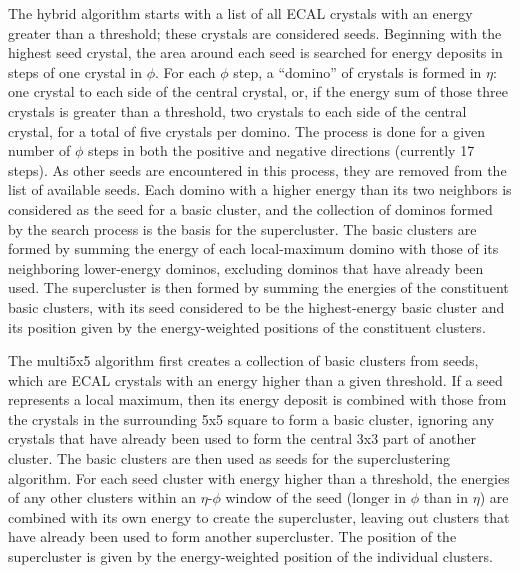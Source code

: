 The hybrid algorithm starts with a list of all 
ECAL crystals with an energy greater than a threshold; 
these crystals are considered seeds.  
Beginning with the highest seed crystal, 
the area around each seed is searched for 
energy deposits in steps of one crystal in $\phi$.
For each $\phi$ step, a ``domino'' of crystals is 
formed in $\eta$: 
one crystal to each side of the central crystal, 
or, if the energy sum of those three crystals is 
greater than a threshold, 
two crystals to each side of the central crystal, 
for a total of five crystals per domino.  
The process is done for a given number of $\phi$ 
steps in both the positive and negative directions 
(currently 17 steps).  
As other seeds are encountered in this process, 
they are removed from the list of available seeds.  
Each domino with a higher energy than its two neighbors 
is considered as the seed for a basic cluster, 
and the collection of dominos formed by the search 
process is the basis for the supercluster.  
The basic clusters are formed by summing the 
energy of each local-maximum domino with 
those of its neighboring lower-energy dominos, 
excluding dominos that have already been used.  
The supercluster is then formed by summing the energies 
of the constituent basic clusters, 
with its seed considered to be the highest-energy 
basic cluster 
and its position given by the energy-weighted positions 
of the constituent clusters.  



The multi5x5 algorithm first creates a collection 
of basic clusters from seeds, 
which are ECAL crystals with an energy higher than 
a given threshold.  
If a seed represents a local maximum, 
then its energy deposit is combined with those 
from the crystals in the surrounding 5x5 square 
to form a basic cluster, 
ignoring any crystals that have already been 
used to form the central 3x3 part of another cluster.  
The basic clusters are then used as seeds for the 
superclustering algorithm.  
For each seed cluster with energy higher than a threshold, 
the energies of any other clusters within an $\eta$-$\phi$ 
window of the seed (longer in $\phi$ than in $\eta$)
are combined with its own energy to create the supercluster, 
leaving out clusters that have already been used to 
form another supercluster. 
The position of the supercluster is given by the 
energy-weighted position of the individual clusters.  


